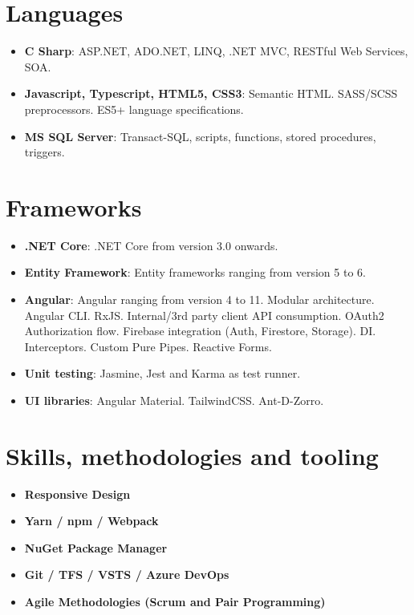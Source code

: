 \documentclass[letterpaper,11pt]{article}
\newcommand{\resumeItem}[2]{
  \item\small{
    \textbf{#1}{: #2 \vspace{-2pt}}
  }
}
\newcommand{\resumeItemAlign}[2]{
  \vspace{-1pt}\item\small{
    \textbf{#1} \hfill \textit{#2}
  }\vspace{-5pt}
}
\newcommand{\resumeSubHeadingListStart}{\begin{itemize}[leftmargin=*]}
\newcommand{\resumeSubHeadingListEnd}{\end{itemize}}
\begin{document}
\section{Languages}
\resumeSubHeadingListStart	
	\resumeItem{C Sharp} 
	{ASP.NET, ADO.NET, LINQ, .NET MVC, RESTful Web Services, SOA.}
	\resumeItem{Javascript, Typescript, HTML5, CSS3}{Semantic HTML. SASS/SCSS preprocessors. ES5+ language specifications.}\\
	\resumeItem{MS SQL Server} 
	{Transact-SQL, scripts, functions, stored procedures, triggers.}\\
	
\resumeSubHeadingListEnd


\section{Frameworks}
\resumeSubHeadingListStart
  \resumeItem{.NET Core}
    {.NET Core from version 3.0 onwards.}\\
  \resumeItem{Entity Framework}
    {Entity frameworks ranging from version 5 to 6.}\\
  \resumeItem{Angular}
    {Angular ranging from version 4 to 11. Modular architecture. Angular CLI. RxJS. Internal/3rd party client API consumption. OAuth2 Authorization flow. Firebase integration (Auth, Firestore, Storage). DI. Interceptors. Custom Pure Pipes. Reactive Forms.}
\resumeItem{Unit testing}
	{Jasmine, Jest and Karma as test runner.}
\resumeItem{UI libraries}
	{Angular Material.  TailwindCSS. Ant-D-Zorro.}
\resumeSubHeadingListEnd



\section{Skills,  methodologies and tooling}

\resumeSubHeadingListStart
	\resumeItemAlign{Responsive Design}{}
	\resumeItemAlign{Yarn / npm / Webpack}{}
	\resumeItemAlign{NuGet Package Manager}{}
	\resumeItemAlign{Git / TFS / VSTS / Azure DevOps}{}
	\resumeItemAlign{Agile Methodologies (Scrum and Pair Programming) }{}
\resumeSubHeadingListEnd
\end{document}
